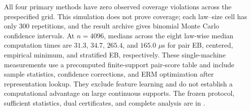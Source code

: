 All four primary methods have zero observed coverage violations across the
prespecified grid. This simulation does not prove coverage; each law--size
cell has only 300 repetitions, and the result archive gives binomial Monte
Carlo confidence intervals. At $n=4096$, medians across the eight
law-wise median computation times are $31.3$, $34.7$, $265.4$, and $165.0$
$\mu$s for pair EB, centered, empirical minimum, and stratified EB,
respectively. These single-machine measurements use a precomputed finite-support
pair-score table and include sample statistics, confidence corrections, and
ERM optimization after representation lookup. They exclude feature learning
and do not establish a computational advantage on large continuous supports.
The frozen protocol, sufficient statistics, dual certificates, and complete
analysis are in .
